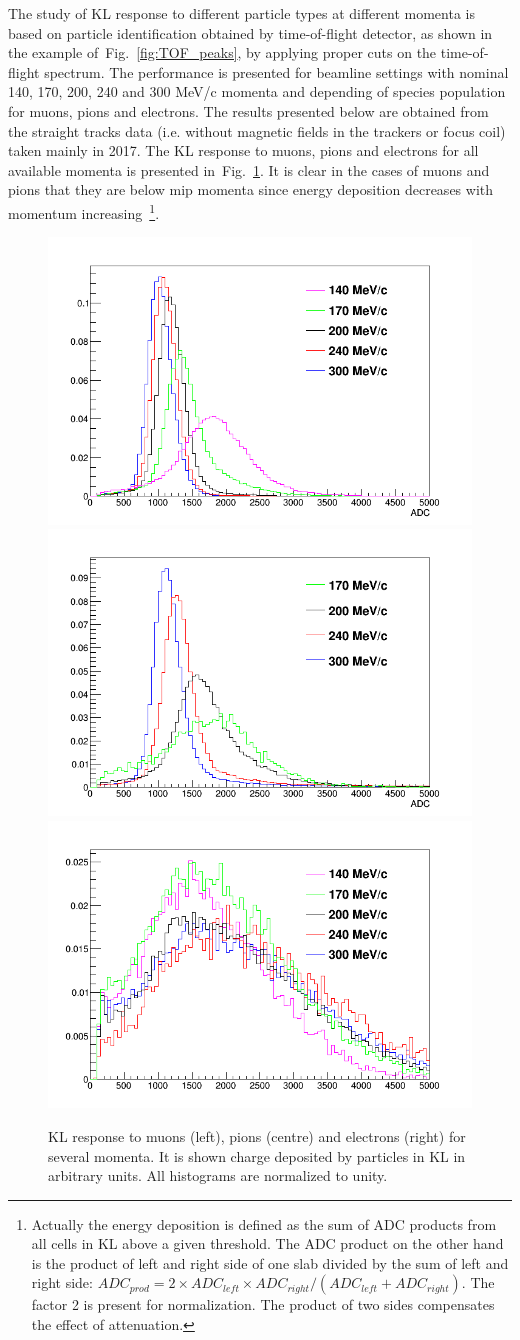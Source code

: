 The study of KL response to different particle types at different momenta is based on particle identification obtained by time-of-flight detector, as shown in the example of~Fig.~\ref{fig:TOF_peaks}, by applying proper cuts on the time-of-flight spectrum. The performance is presented for beamline settings with nominal 140, 170, 200, 240 and 300 MeV/c momenta and depending of species population for muons, pions and electrons. The results presented below are obtained from the straight tracks data (i.e. without magnetic fields in the trackers or focus coil) taken mainly in 2017. The KL response to muons, pions and electrons for all available momenta is presented in~Fig.~\ref{fig:KL_to_mu_pi_e}. It is clear in the cases of muons and pions that they are below mip momenta since energy deposition decreases with momentum increasing~\footnote{Actually the energy deposition is defined as the sum of ADC products from all cells in KL above a given threshold. The ADC product on the other hand is the product of left and right side of one slab divided by the sum of left and right side: $ADC_{prod} = 2 \times ADC_{left}  \times ADC_{right} / (ADC_{left} + ADC_{right})$. The factor 2 is present for normalization. The product of two sides compensates the effect of attenuation.}.
  \begin{figure}
	\begin{center}
  		\includegraphics[width=0.32\columnwidth]{./04-KL/Figures/muon.png}
  		\includegraphics[width=0.32\columnwidth]{./04-KL/Figures/pion.png}
  		\includegraphics[width=0.32\columnwidth]{./04-KL/Figures/electron.png}
  		\caption{KL response to muons (left), pions (centre) and electrons (right) for several momenta. It is shown charge deposited by particles in KL in arbitrary units. All histograms are normalized to unity.}
  		\label{fig:KL_to_mu_pi_e}
  	\end{center}
  \end{figure}

